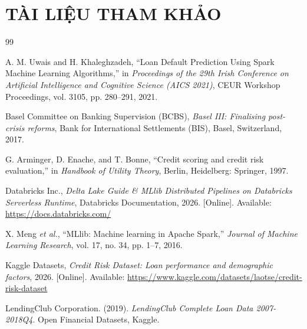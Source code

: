 \chapter*{TÀI LIỆU THAM KHẢO}

\begin{thebibliography}{99}

A. M. Uwais and H. Khaleghzadeh, 
``Loan Default Prediction Using Spark Machine Learning Algorithms,'' 
in \textit{Proceedings of the 29th Irish Conference on Artificial Intelligence and Cognitive Science (AICS 2021)}, CEUR Workshop Proceedings, vol. 3105, pp. 280--291, 2021.

Basel Committee on Banking Supervision (BCBS), 
\textit{Basel III: Finalising post-crisis reforms}, 
Bank for International Settlements (BIS), Basel, Switzerland, 2017.

G. Arminger, D. Enache, and T. Bonne, 
``Credit scoring and credit risk evaluation,'' 
in \textit{Handbook of Utility Theory}, Berlin, Heidelberg: Springer, 1997.

Databricks Inc., 
\textit{Delta Lake Guide \& MLlib Distributed Pipelines on Databricks Serverless Runtime}, 
Databricks Documentation, 2026. [Online]. Available: \url{https://docs.databricks.com/}

X. Meng \textit{et al.}, 
``MLlib: Machine learning in Apache Spark,'' 
\textit{Journal of Machine Learning Research}, vol. 17, no. 34, pp. 1--7, 2016.

Kaggle Datasets, 
\textit{Credit Risk Dataset: Loan performance and demographic factors}, 
2026. [Online]. Available: \url{https://www.kaggle.com/datasets/laotse/credit-risk-dataset}

     LendingClub Corporation. (2019). \textit{LendingClub Complete Loan Data 2007-2018Q4}. Open Financial Datasets, Kaggle.
\end{thebibliography}
